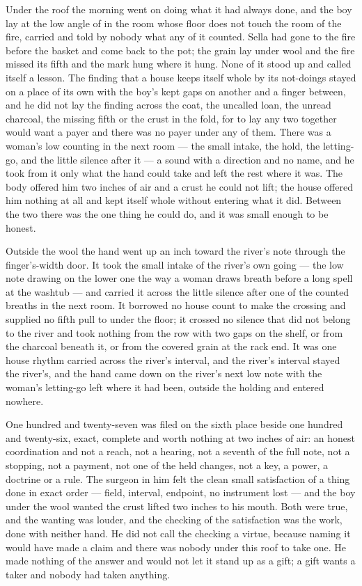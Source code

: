 Under the roof the morning went on doing what it had always done, and the boy lay at the low angle of  in the room whose floor does not touch the room of the fire, carried and told by nobody what any of it counted. Sella had gone to the fire before the basket and come back to the pot; the grain lay under wool and the fire missed its fifth and the mark hung where it hung. None of it stood up and called itself a lesson. The finding that a house keeps itself whole by its not-doings stayed on a place of its own with the boy's kept gaps on another and a finger between, and he did not lay the finding across the coat, the uncalled loan, the unread charcoal, the missing fifth or the crust in the fold, for to lay any two together would want a payer and there was no payer under any of them. There was a woman's low counting in the next room --- the small intake, the hold, the letting-go, and the little silence after it --- a sound with a direction and no name, and he took from it only what the hand could take and left the rest where it was. The body offered him two inches of air and a crust he could not lift; the house offered him nothing at all and kept itself whole without entering what it did. Between the two there was the one thing he could do, and it was small enough to be honest.

Outside the wool the hand went up an inch toward the river's note through the finger's-width door. It took the small intake of the river's own going --- the low note drawing on the lower one the way a woman draws breath before a long spell at the washtub --- and carried it across the little silence after one of the counted breaths in the next room. It borrowed no house count to make the crossing and supplied no fifth pull to  under the floor; it crossed no silence that did not belong to the river and took nothing from the row with two gaps on the shelf, or from the charcoal beneath it, or from the covered grain at the rack end. It was one house rhythm carried across the river's interval, and the river's interval stayed the river's, and the hand came down on the river's next low note with the woman's letting-go left where it had been, outside the holding and entered nowhere.

One hundred and twenty-seven was filed on the sixth place beside one hundred and twenty-six, exact, complete and worth nothing at two inches of air: an honest coordination and not a reach, not a hearing, not a seventh of the full note, not a stopping, not a payment, not one of the held changes, not a key, a power, a doctrine or a rule. The surgeon in him felt the clean small satisfaction of a thing done in exact order --- field, interval, endpoint, no instrument lost --- and the boy under the wool wanted the crust lifted two inches to his mouth. Both were true, and the wanting was louder, and the checking of the satisfaction was the work, done with neither hand. He did not call the checking a virtue, because naming it would have made a claim and there was nobody under this roof to take one. He made nothing of the answer and would not let it stand up as a gift; a gift wants a taker and nobody had taken anything.

